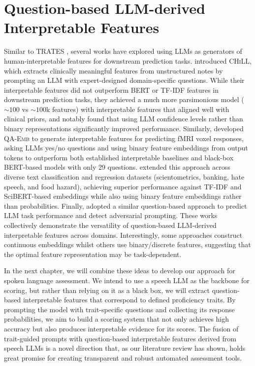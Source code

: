 \documentclass{report}
\begin{document}
\section{Question-based LLM-derived Interpretable Features}
\label{sec:llm_derived_interpretable_features}
Similar to \textsc{TRATES} \citep{eltanbouly2025tratestraitspecificrubricassistedcrossprompt}, several works have explored using LLMs as generators of human-interpretable features for downstream prediction tasks. \citet{mcinerney2023chillzeroshotcustominterpretable} introduced \textsc{CHiLL}, which extracts clinically meaningful features from unstructured notes by prompting an LLM with expert-designed domain-specific questions. While their interpretable features did not outperform BERT or TF-IDF features in downstream prediction tasks, they achieved a much more parsimonious model ($\sim100$ vs $\sim100$k features) with interpretable features that aligned well with clinical priors, and notably found that using LLM confidence levels rather than binary representations significantly improved performance. Similarly, \citet{benara2024craftinginterpretableembeddingsasking} developed \textsc{QA-Emb} to generate interpretable features for predicting fMRI voxel responses, asking LLMs yes/no questions and using binary feature embeddings from output tokens to outperform both established interpretable baselines and black-box BERT-based models with only 29 questions. \cite{balek2025llmbasedfeaturegenerationtext} extended this approach across diverse text classification and regression datasets (scientometrics, banking, hate speech, and food hazard), achieving superior performance against TF-IDF and SciBERT-based embeddings while also using binary feature embeddings rather than probabilities. Finally, \cite{sam2025predictingperformanceblackboxllms} adopted a similar question-based approach to predict LLM task performance and detect adversarial prompting. These works collectively demonstrate the versatility of question-based LLM-derived interpretable features across domains. Interestingly, some approaches construct continuous embeddings whilst others use binary/discrete features, suggesting that the optimal feature representation may be task-dependent.

In the next chapter, we will combine these ideas to develop our approach for spoken language assessment. We intend to use a speech LLM as the backbone for scoring, but rather than relying on it as a black box, we will extract question-based interpretable features that correspond to defined proficiency traits. By prompting the model with trait-specific questions and collecting its response probabilities, we aim to build a scoring system that not only achieves high accuracy but also produces interpretable evidence for its scores. The fusion of trait-guided prompts with question-based interpretable features derived from speech LLMs is a novel direction that, as our literature review has shown, holds great promise for creating transparent and robust automated assessment tools.
\end{document}
